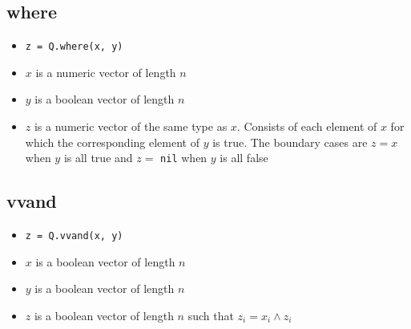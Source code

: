 \subsection{where}
\label{where}

\begin{itemize}
\item \verb+z = Q.where(x, y)+ 
\item \(x\) is a numeric vector of length \(n\)
\item \(y\) is a boolean vector of length \(n\)
\item \(z\) is a numeric vector of the same type as \(x\). Consists of each
element of \(x\) for which the corresponding element of \(y\) is true. The
boundary cases are \(z = x\) when \(y\) is all true and \(z =\) {\tt nil} when
\(y\) is all false
\end{itemize}

\subsection{vvand}
\label{vvand}

\begin{itemize}
\item \verb+z = Q.vvand(x, y)+ 
\item \(x\) is a boolean vector of length \(n\)
\item \(y\) is a boolean vector of length \(n\)
\item \(z\) is a boolean vector of length \(n\) such that \(z_i = x_i \wedge z_i\)
\end{itemize}

